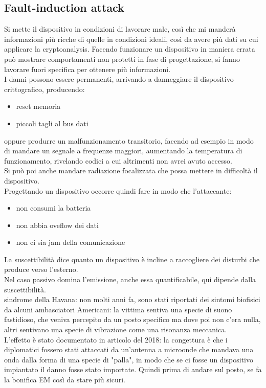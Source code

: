 \documentclass[oneside, 12pt]{extbook}
\begin{document}
\subsection{Fault-induction attack}
Si mette il dispositivo in condizioni di lavorare male, così che mi manderà informazioni più ricche di quelle in condizioni ideali, così da avere più dati su cui applicare la cryptoanalysis. Facendo funzionare un dispositivo in maniera errata può mostrare comportamenti non protetti in fase di progettazione, si fanno lavorare fuori specifica per ottenere più informazioni.\\I danni possono essere permanenti, arrivando a danneggiare il dispositivo crittografico, producendo:
\begin{itemize}
	\item reset memoria
	\item piccoli tagli al bus dati
\end{itemize}
oppure produrre un malfunzionamento transitorio, facendo ad esempio in modo di mandare un segnale a frequenze maggiori, aumentando la temperatura di funzionamento, rivelando codici a cui altrimenti non avrei avuto accesso.\\Si può poi anche mandare radiazione focalizzata che possa mettere in difficoltà il dispositivo.\\Progettando un dispositivo occorre quindi fare in modo che l'attaccante:
\begin{itemize}
	\item non consumi la batteria
	\item non abbia oveflow dei dati
	\item non ci sia jam della comunicazione
\end{itemize}
La suscettibilità dice quanto un dispositivo è incline a raccogliere dei disturbi che produce verso l'esterno.\\Nel caso passivo domina l'emissione, anche essa quantificabile, qui dipende dalla suscettibilità.\\
\textsf{sindrome della Havana}: non molti anni fa, sono stati riportati dei sintomi biofisici da alcuni ambasciatori Americani: la vittima sentiva una specie di suono fastidioso, che veniva percepito da un posto specifico ma dove poi non c'era nulla, altri sentivano una specie di vibrazione come una risonanza meccanica.\\L'effetto è stato documentato in articolo del 2018: la congettura è che i diplomatici fossero stati attaccati da un'antenna a microonde che mandava una onda dalla forma di una specie di "palla", in modo che se ci fosse un dispositivo impiantato il danno fosse stato importate. Quindi prima di andare sul posto, se fa la bonifica EM così da stare più sicuri.
\end{document}
